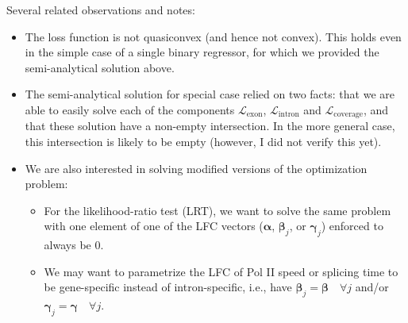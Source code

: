 \documentclass{article}
\begin{document}
	Several related observations and notes:
	\begin{itemize}
		\item The loss function is not quasiconvex (and hence not convex). This holds even in the simple case of a single binary regressor, for which we provided the semi-analytical solution above.
		\item The semi-analytical solution for special case relied on two facts: that we are able to easily solve each of the components $\mathcal{L}_{\text{exon}}$,  $\mathcal{L}_{\text{intron}}$ and $\mathcal{L}_{\text{coverage}}$, and that these solution have a non-empty intersection. In the more general case, this intersection is likely to be empty (however, I did not verify this yet).
		\item We are also interested in solving modified versions of the optimization problem:
		\begin{itemize}
			\item For the likelihood-ratio test (LRT), we want to solve the same problem with one element of one of the LFC vectors ($\boldsymbol{\alpha}$, $\boldsymbol{\beta}_j$, or $\boldsymbol{\gamma}_j$) enforced to always be 0. 
			\item We may want to parametrize the LFC of Pol II speed or splicing time to be gene-specific instead of intron-specific, i.e., have $\boldsymbol{\beta}_j=\boldsymbol{\beta} \quad  \forall j$ and/or $\boldsymbol{\gamma}_j=\boldsymbol{\gamma} \quad  \forall j$. 
			
		\end{itemize}
	\end{itemize}
	
	
	
	
	
	
	
	
	
	
	
	
	
	
\end{document}
